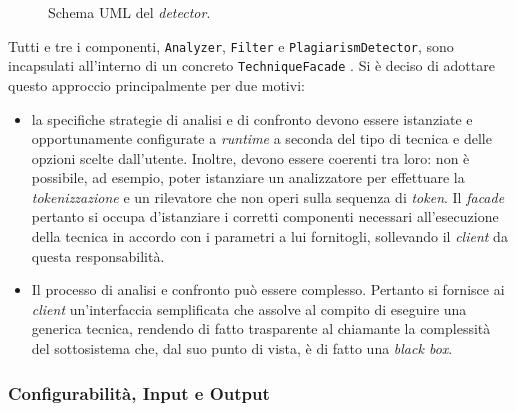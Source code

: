 \begin{figure}
    \caption{Schema UML del \textit{detector}.}
    \label{img:02-detector}
\end{figure}

Tutti e tre i componenti, \texttt{Analyzer}, \texttt{Filter} e \texttt{PlagiarismDetector}, sono incapsulati all'interno di un concreto \texttt{TechniqueFacade} \cite{gof}.
%
Si è deciso di adottare questo approccio principalmente per due motivi:
\begin{itemize}
    \item la specifiche strategie di analisi e di confronto devono essere istanziate e opportunamente configurate a \textit{runtime} a seconda del tipo di tecnica e delle opzioni scelte dall'utente. Inoltre, devono essere coerenti tra loro: non è possibile, ad esempio, poter istanziare un analizzatore per effettuare la \textit{tokenizzazione} e un rilevatore che non operi sulla sequenza di \textit{token}. Il \textit{facade} pertanto si occupa d'istanziare i corretti componenti necessari all'esecuzione della tecnica in accordo con i parametri a lui fornitogli, sollevando il \textit{client} da questa responsabilità.
    \item Il processo di analisi e confronto può essere complesso. Pertanto si fornisce ai \textit{client} un'interfaccia semplificata che assolve al compito di eseguire una generica tecnica, rendendo di fatto trasparente al chiamante la complessità del sottosistema che, dal suo punto di vista, è di fatto una \textit{black box}.
\end{itemize}

\subsubsection*{Configurabilità, Input e Output}

